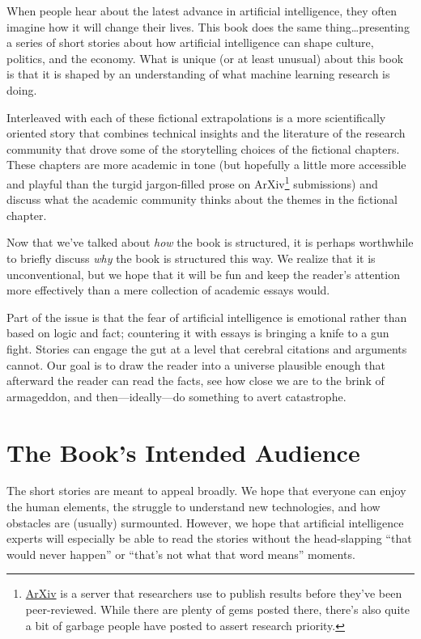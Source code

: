 When people hear about the latest advance in artificial intelligence, they often imagine how it will change their lives.  This book does the same thing\dots presenting a series of short stories about how artificial intelligence can shape culture, politics, and the economy.  What is unique (or at least unusual) about this book is that it is shaped by an understanding of what machine learning research is doing.

Interleaved with each of these fictional extrapolations is a more scientifically oriented story that combines technical insights and the literature of the research community that drove some of the storytelling choices of the fictional chapters.  These chapters are more academic in tone (but hopefully a little more accessible and playful than the turgid jargon-filled prose on ArXiv\footnote{\href{http://arxiv.org}{ArXiv} is a server that researchers use to publish results before they've been peer-reviewed.  While there are plenty of gems posted there, there's also quite a bit of garbage people have posted to assert research priority.} submissions) and discuss what the academic community thinks about the themes in the fictional chapter.

Now that we've talked about \emph{how} the book is structured, it is perhaps worthwhile to briefly discuss \emph{why} the book is structured this way.  We realize that it is unconventional, but we hope that it will be fun and keep the reader's attention more effectively than a mere collection of academic essays would.

Part of the issue is that the fear of artificial intelligence is emotional rather than based on logic and fact; countering it with essays is bringing a knife to a gun fight.  Stories can engage the gut at a level that cerebral citations and arguments cannot.  Our goal is to draw the reader into a universe plausible enough that afterward the reader can read the facts, see how close we are to the brink of armageddon, and then---ideally---do something to avert catastrophe.

\section{The Book's Intended Audience}

The short stories are meant to appeal broadly.  We hope that everyone can enjoy the human elements, the struggle to understand new technologies, and how obstacles are (usually) surmounted.  However, we hope that artificial intelligence experts will especially be able to read the stories without the head-slapping ``that would never happen'' or ``that's not what that word means'' moments.


